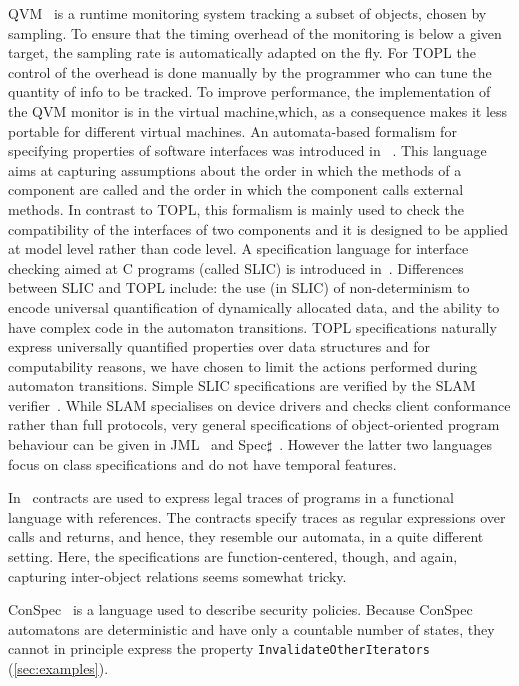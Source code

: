 \documentclass[9pt, preprint]{sigplanconf} %
\theoremstyle{definition}
\theoremstyle{remark}
\begin{document}
QVM~\cite{arnold:2008} is a runtime monitoring system tracking a subset of objects, chosen by
sampling. To ensure that the timing overhead of the monitoring is below a given target, the sampling rate is 
automatically adapted on the fly. For TOPL the control of the overhead is done manually by  the programmer who can tune the quantity of info to be tracked.
To improve performance,  the implementation of the QVM monitor is in the virtual machine,which, as a consequence makes it less portable for
different virtual machines. 
An automata-based formalism for specifying properties of software interfaces was introduced in~\cite{dblp:conf/sigsoft/AlfaroH01} .
This language aims at capturing assumptions about the order in which the methods of a component are called and the order in which the component calls external methods.
In contrast to TOPL, this formalism is mainly used to check the compatibility of the interfaces of two components and it is designed to be applied at  model level rather than code level.
A specification language for interface checking aimed at C programs (called SLIC) is introduced in~\cite{ball2002}.
Differences between SLIC and TOPL include: the use (in SLIC) of non-determinism to encode universal quantification of dynamically allocated data, and the  ability to have complex code in the automaton transitions.
TOPL specifications naturally express universally quantified properties over data structures and for computability reasons,  we have chosen to limit the  actions performed during automaton transitions.
Simple SLIC specifications are verified by  the SLAM verifier~\cite{dblp:conf/cav/ballr01}.
While SLAM specialises on device drivers and checks client conformance rather than full protocols,
very general specifications of object-oriented program behaviour can be given in JML~\cite{jml} and Spec$\sharp$~\cite{DBLP:journals/jot/BarnettDFLS04}. However the latter two languages focus on class specifications and do not have temporal features.

In~\cite{disney2011} contracts are used to express legal traces of programs in a functional language with references.
The contracts specify traces as regular expressions over calls and returns, and hence, they resemble our automata, in a quite different setting.
Here, the specifications are function-centered, though, and again, capturing inter-object relations seems somewhat tricky.

ConSpec~\cite{DBLP:journals/entcs/AktugN08} is a language used to describe security policies.
Because ConSpec automatons are deterministic and have only a countable number of states, they cannot in principle express the property \texttt{InvalidateOtherIterators} (\autoref{sec:examples}).
\end{document}
